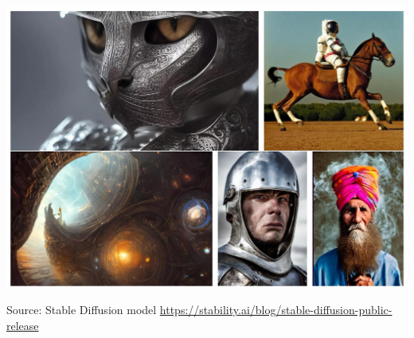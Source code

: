\documentclass[10pt]{article}
\begin{document}
\begin{center}
\includegraphics[max width=\textwidth]{2024_01_08_e090cb7d953bac87fc33g-10}
\end{center}

Source: Stable Diffusion model \href{https://stability.ai/blog/stable-diffusion-public-release}{https://stability.ai/blog/stable-diffusion-public-release}
\end{document}
